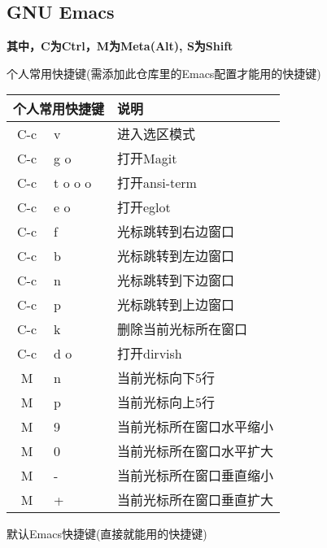 \documentclass[11pt]{article}
\begin{document}
\subsection{GNU Emacs}
\begin{center}
  \textbf{其中，C为Ctrl，M为Meta(Alt), S为Shift}
\end{center}
\begin{flushleft}
  个人常用快捷键(需添加此仓库里的Emacs配置才能用的快捷键)
\end{flushleft}
\begin{left}
  \begin{tabular}{|c|l|l|}
    \hline
    \multicolumn{2}{|c|}{个人常用快捷键} & 说明 \\ 
    \hline
    C-c & v & 进入选区模式 \\
    C-c & g o & 打开Magit \\
    C-c & t o o o & 打开ansi-term \\
    C-c & e o & 打开eglot \\
    C-c & f & 光标跳转到右边窗口 \\
    C-c & b & 光标跳转到左边窗口 \\
    C-c & n & 光标跳转到下边窗口 \\
    C-c & p & 光标跳转到上边窗口 \\
    C-c & k & 删除当前光标所在窗口 \\
    C-c & d o & 打开dirvish \\
    M & n & 当前光标向下5行 \\
    M & p & 当前光标向上5行 \\
    M & 9 & 当前光标所在窗口水平缩小 \\
    M & 0 & 当前光标所在窗口水平扩大 \\
    M & - & 当前光标所在窗口垂直缩小 \\
    M & + & 当前光标所在窗口垂直扩大 \\            
    \hline
  \end{tabular}  
\end{left}
\newpage{}
\begin{flushleft}
  默认Emacs快捷键(直接就能用的快捷键)
\end{flushleft}
\end{document}
